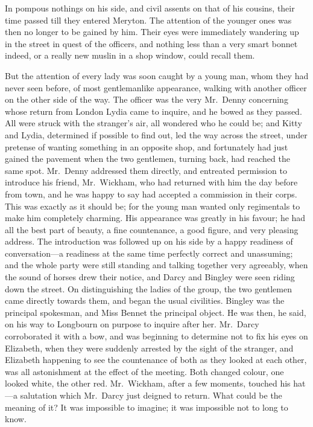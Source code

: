 \documentclass[12pt,english]{book}
\begin{document}
In pompous nothings on his side, and civil assents on that of his
cousins, their time passed till they entered Meryton. The attention
of the younger ones was then no longer to be gained by him. Their
eyes were immediately wandering up in the street in quest of the officers,
and nothing less than a very smart bonnet indeed, or a really new
muslin in a shop window, could recall them.

But the attention of every lady was soon caught by a young man, whom
they had never seen before, of most gentlemanlike appearance, walking
with another officer on the other side of the way. The officer was
the very Mr.\ Denny concerning whose return from London Lydia came
to inquire, and he bowed as they passed. All were struck with the
stranger's air, all wondered who he could be; and Kitty and Lydia,
determined if possible to find out, led the way across the street,
under pretense of wanting something in an opposite shop, and fortunately
had just gained the pavement when the two gentlemen, turning back,
had reached the same spot. Mr.\ Denny addressed them directly, and
entreated permission to introduce his friend, Mr.\ Wickham, who had
returned with him the day before from town, and he was happy to say
had accepted a commission in their corps. This was exactly as it should
be; for the young man wanted only regimentals to make him completely
charming. His appearance was greatly in his favour; he had all the
best part of beauty, a fine countenance, a good figure, and very pleasing
address. The introduction was followed up on his side by a happy readiness
of conversation\mbox{---}a readiness at the same time perfectly correct
and unassuming; and the whole party were still standing and talking
together very agreeably, when the sound of horses drew their notice,
and Darcy and Bingley were seen riding down the street. On distinguishing
the ladies of the group, the two gentlemen came directly towards them,
and began the usual civilities. Bingley was the principal spokesman,
and Miss Bennet the principal object. He was then, he said, on his
way to Longbourn on purpose to inquire after her. Mr.\ Darcy corroborated
it with a bow, and was beginning to determine not to fix his eyes
on Elizabeth, when they were suddenly arrested by the sight of the
stranger, and Elizabeth happening to see the countenance of both as
they looked at each other, was all astonishment at the effect of the
meeting. Both changed colour, one looked white, the other red. Mr.\ Wickham,
after a few moments, touched his hat\mbox{---}a salutation which
Mr.\ Darcy just deigned to return. What could be the meaning of it?
It was impossible to imagine; it was impossible not to long to know.
\end{document}
